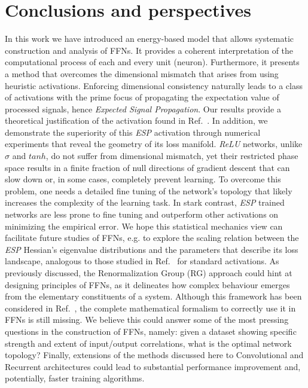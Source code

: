 \documentclass[5p]{elsarticle}
\begin{document}
\section{Conclusions and perspectives}
%
In this work we have introduced an energy-based model that allows systematic construction and analysis of FFNs. It provides a  coherent interpretation of the computational process of each and every unit (neuron). Furthermore, it presents a method that overcomes the dimensional mismatch that arises from using heuristic activations. Enforcing dimensional consistency naturally leads to a class of activations with the prime focus of propagating the expectation value of processed signals, hence {\it Expected Signal Propagation}. Our results provide a theoretical justification of the activation found in Ref.~\cite{prajit}. In addition, we demonstrate the superiority of this {\it ESP} activation through numerical experiments that reveal the geometry of its loss manifold. {\it ReLU} networks, unlike $\sigma$ and $tanh$,  do not suffer from dimensional mismatch, yet their restricted phase space results in a finite fraction of null directions of gradient descent that can slow down or, in some cases, completely prevent learning. To overcome this problem, one needs a detailed fine tuning of the network's topology that likely increases the complexity of the learning task. In stark contrast, {\it ESP} trained networks are less prone to fine tuning and outperform other activations on minimizing the empirical error. We hope this statistical mechanics view can facilitate future studies of FFNs, e.g. to explore the scaling relation between the {\it ESP} Hessian's eigenvalue distributions and the parameters that describe its loss landscape, analogous to those studied in Ref.~\cite{penn1} for standard activations. As previously discussed, the Renormalization Group (RG) approach could hint at designing principles of FFNs, as it delineates how complex behaviour emerges from the elementary constituents of a system. Although this framework has been considered in Ref.~\cite{mehta, maciej}, the complete mathematical formalism to correctly use it in FFNs is still missing. We believe this could answer some of the most pressing questions in the construction of FFNs, namely: given a dataset showing specific strength and extent of input/output correlations, what is the optimal network topology? Finally, extensions of the methods discussed here to Convolutional and Recurrent architectures could lead to substantial performance improvement and, potentially, faster training algorithms.
\end{document}
